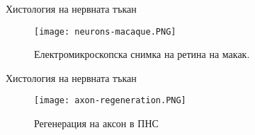 \begin{frame}[t]{Хистология на нервната тъкан}
    \begin{figure}[htbp!]
      \centering
      \texttt{[image: neurons-macaque.PNG]}
      \caption{Електромикроскопска снимка на ретина на макак. \cite[Фиг 1.3]{Neuron}}
    \end{figure}
\end{frame}


\begin{frame}[t]{Хистология на нервната тъкан}
    \begin{figure}[htbp!]
      \centering
      \texttt{[image: axon-regeneration.PNG]}
      \caption{Регенерация на аксон в ПНС \cite[Фиг 25.5]{Neuroscience}}
    \end{figure}
\end{frame}

